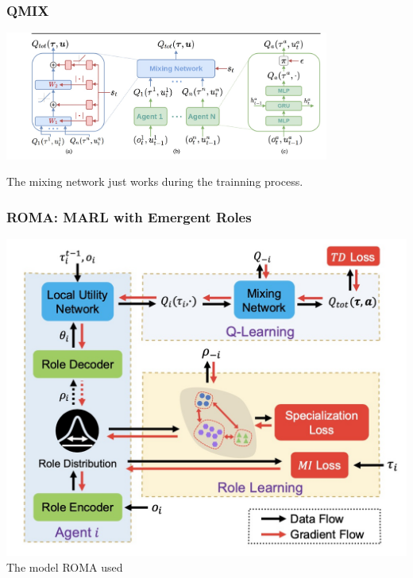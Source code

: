 \documentclass[notheorems, aspectratio=54]{beamer}
\begin{document}
\begin{frame}
  \frametitle{QMIX}
  \begin{center}
    \includegraphics[width=0.8\textwidth]{QMIX.png}
  \end{center}
    The mixing network just works during the trainning process.\\
\end{frame}

\begin{frame}

\frametitle{ROMA: MARL with Emergent Roles}
\begin{center}
\begin{minipage}{0.6\textwidth}
  \begin{center}
  \includegraphics[width=\textwidth]{ roma.png}
  The model ROMA used 
  \end{center}
\end{minipage}
\end{center}
\end{frame}
\end{document}
